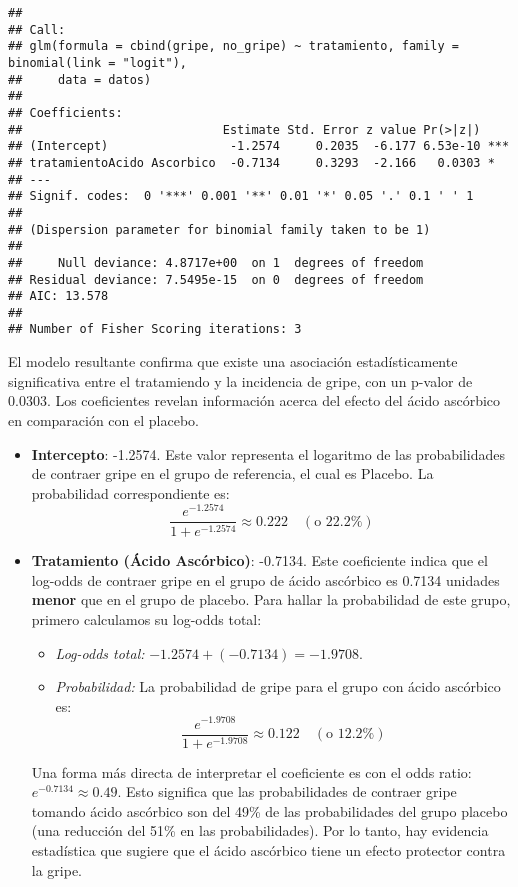 \documentclass[paper=letter, fontsize=11pt, draft=false]{scrartcl}\usepackage[]{graphicx}\usepackage[]{xcolor}
\makeatletter
\newenvironment{kframe}{%
 \def\at@end@of@kframe{}%
 \ifinner\ifhmode%
  \def\at@end@of@kframe{\end{minipage}}%
  \begin{minipage}{\columnwidth}%
 \fi\fi%
 \def\FrameCommand##1{\hskip\@totalleftmargin \hskip-\fboxsep
 \colorbox{shadecolor}{##1}\hskip-\fboxsep
     \hskip-\linewidth \hskip-\@totalleftmargin \hskip\columnwidth}%
 \MakeFramed {\advance\hsize-\width
   \@totalleftmargin\z@ \linewidth\hsize
   \@setminipage}}%
 {\par\unskip\endMakeFramed%
 \at@end@of@kframe}
\newenvironment{knitrout}{}{} %
\numberwithin{equation}{problemcounter} %
\numberwithin{figure}{problemcounter} %
\numberwithin{table}{problemcounter} %
\numberwithin{subsection}{problemcounter}
\makeatother
\begin{document}
\begin{knitrout}
\color{fgcolor}\begin{kframe}
\begin{verbatim}
## 
## Call:
## glm(formula = cbind(gripe, no_gripe) ~ tratamiento, family = binomial(link = "logit"), 
##     data = datos)
## 
## Coefficients:
##                            Estimate Std. Error z value Pr(>|z|)    
## (Intercept)                 -1.2574     0.2035  -6.177 6.53e-10 ***
## tratamientoAcido Ascorbico  -0.7134     0.3293  -2.166   0.0303 *  
## ---
## Signif. codes:  0 '***' 0.001 '**' 0.01 '*' 0.05 '.' 0.1 ' ' 1
## 
## (Dispersion parameter for binomial family taken to be 1)
## 
##     Null deviance: 4.8717e+00  on 1  degrees of freedom
## Residual deviance: 7.5495e-15  on 0  degrees of freedom
## AIC: 13.578
## 
## Number of Fisher Scoring iterations: 3
\end{verbatim}
\end{kframe}
\end{knitrout}

El modelo resultante confirma que existe una asociación estadísticamente significativa entre el tratamiendo y la incidencia de gripe, con un p-valor de 0.0303. Los coeficientes revelan información acerca del efecto del ácido ascórbico en comparación con el placebo.

\begin{itemize}
    \item \textbf{Intercepto}: -1.2574. Este valor representa el logaritmo de las probabilidades de contraer gripe en el grupo de referencia, el cual es Placebo. La probabilidad correspondiente es:
    $$ \frac{e^{-1.2574}}{1 + e^{-1.2574}} \approx 0.222 \quad (\text{o 22.2\%}) $$

    \item \textbf{Tratamiento (Ácido Ascórbico)}: -0.7134. Este coeficiente indica que el log-odds de contraer gripe en el grupo de ácido ascórbico es 0.7134 unidades \textbf{menor} que en el grupo de placebo. Para hallar la probabilidad de este grupo, primero calculamos su log-odds total:
    \begin{itemize}
        \item \textit{Log-odds total:} $-1.2574 + (-0.7134) = -1.9708$.
        \item \textit{Probabilidad:} La probabilidad de gripe para el grupo con ácido ascórbico es:
              $$ \frac{e^{-1.9708}}{1 + e^{-1.9708}} \approx 0.122 \quad (\text{o 12.2\%}) $$
    \end{itemize}
    Una forma más directa de interpretar el coeficiente es con el odds ratio: $e^{-0.7134} \approx 0.49$. Esto significa que las probabilidades de contraer gripe tomando ácido ascórbico son del 49\% de las probabilidades del grupo placebo (una reducción del 51\% en las probabilidades). Por lo tanto, hay evidencia estadística que sugiere que el ácido ascórbico tiene un efecto protector contra la gripe.
\end{itemize}


\end{document}
